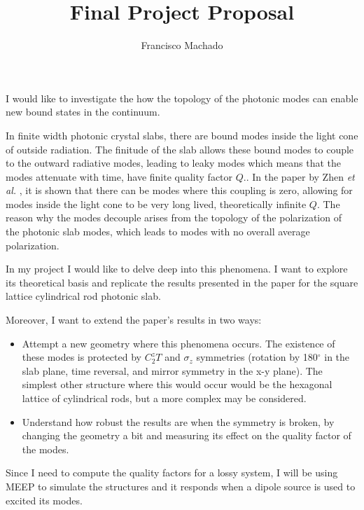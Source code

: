 \documentclass[11pt]{article}
\author{Francisco Machado}
\title{Final Project Proposal}
\begin{document}
\maketitle

I would like to investigate the how the topology of the photonic modes can enable new bound states in the continuum.

In finite width photonic crystal slabs, there are bound modes inside the light cone of outside radiation. The finitude of the slab allows these bound modes to couple to the outward radiative modes, leading to leaky modes which means that the modes attenuate with time, have finite quality factor $Q$.. In the paper by Zhen \emph{et al.} \cite{zhen2014}, it is shown that there can be modes where this coupling is zero, allowing for modes inside the light cone to be very long lived, theoretically infinite $Q$. The reason why the modes decouple arises from the topology of the polarization of the photonic slab modes, which leads to modes with no overall average polarization.

In my project I would like to delve deep into this phenomena. I want to explore its theoretical basis and replicate the results presented in the paper for the square lattice cylindrical rod photonic slab.

Moreover, I want to extend the paper's results in two ways:
\begin{itemize}
\item Attempt a new geometry where this phenomena occurs. The existence of these modes is protected by $C_2^zT$ and $\sigma_z$ symmetries (rotation by 180$^\circ$ in the slab plane, time reversal, and mirror symmetry in the x-y plane). The simplest other structure where this would occur would be the hexagonal lattice of cylindrical rods, but a more complex may be considered.
\item Understand how robust the results are when the symmetry is broken, by changing the geometry a bit and measuring its effect on the quality factor of the modes.
\end{itemize}

Since I need to compute the quality factors for a lossy system, I will be using MEEP to simulate the structures and it responds when a dipole source is used to excited its modes.




\end{document}
